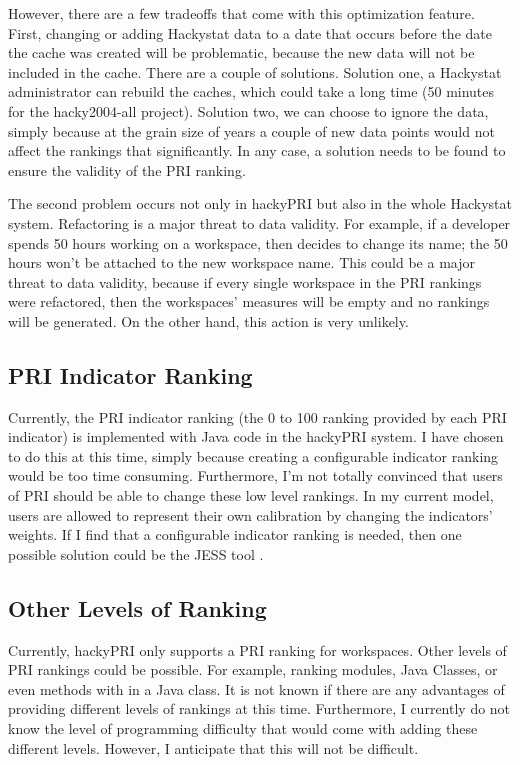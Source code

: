 However, there are a few tradeoffs that come with this optimization
feature. First, changing or adding Hackystat data to a date that occurs
before the date the cache was created will be problematic, because the new
data will not be included in the cache. There are a couple of solutions.
Solution one, a Hackystat administrator can rebuild the caches, which could
take a long time (50 minutes for the hacky2004-all project). Solution two,
we can choose to ignore the data, simply because at the grain size of years
a couple of new data points would not affect the rankings that
significantly. In any case, a solution needs to be found to ensure the
validity of the PRI ranking.

The second problem occurs not only in hackyPRI but also in the whole
Hackystat system. Refactoring is a major threat to data validity. For
example, if a developer spends 50 hours working on a workspace, then
decides to change its name; the 50 hours won't be attached to the new
workspace name. This could be a major threat to data validity, because if
every single workspace in the PRI rankings were refactored, then the
workspaces' measures will be empty and no rankings will be generated. On
the other hand, this action is very unlikely.


\subsection{PRI Indicator Ranking}
\label{subsection:priIndicatorRanking-JESS}
Currently, the PRI indicator ranking (the 0 to 100 ranking provided by each
PRI indicator) is implemented with Java code in the hackyPRI system. I have
chosen to do this at this time, simply because creating a configurable
indicator ranking would be too time consuming. Furthermore, I'm not totally
convinced that users of PRI should be able to change these low level
rankings. In my current model, users are allowed to represent their own
calibration by changing the indicators' weights. If I find that a
configurable indicator ranking is needed, then one possible solution could
be the JESS tool \cite{Jess}.


\subsection{Other Levels of Ranking}
Currently, hackyPRI only supports a PRI ranking for workspaces. Other
levels of PRI rankings could be possible. For example, ranking modules,
Java Classes, or even methods with in a Java class. It is not known if
there are any advantages of providing different levels of rankings at this
time. Furthermore, I currently do not know the level of programming
difficulty that would come with adding these different levels. However, I
anticipate that this will not be difficult.


